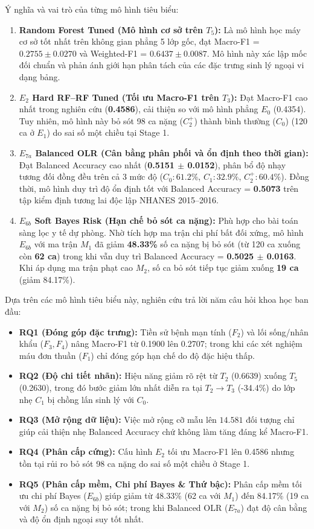 Ý nghĩa và vai trò của từng mô hình tiêu biểu:
\begin{enumerate}
    \item \textbf{Random Forest Tuned (Mô hình cơ sở trên $T_5$):} Là mô hình học máy cơ sở tốt nhất trên không gian phẳng 5 lớp gốc, đạt Macro-F1 = $0.2755 \pm 0.0270$ và Weighted-F1 = $0.6437 \pm 0.0087$. Mô hình này xác lập mốc đối chuẩn và phản ánh giới hạn phân tách của các đặc trưng sinh lý ngoại vi dạng bảng.
    \item \textbf{$E_2$ Hard RF--RF Tuned (Tối ưu Macro-F1 trên $T_3$):} Đạt Macro-F1 cao nhất trong nghiên cứu (\textbf{0.4586}), cải thiện so với mô hình phẳng $E_0$ (0.4354). Tuy nhiên, mô hình này bỏ sót 98 ca nặng ($C_2^+$) thành bình thường ($C_0$) (120 ca ở $E_1$) do sai số một chiều tại Stage 1.
    \item \textbf{$E_{7a}$ Balanced OLR (Cân bằng phân phối và ổn định theo thời gian):} Đạt Balanced Accuracy cao nhất (\textbf{0.5151 $\pm$ 0.0152}), phân bổ độ nhạy tương đối đồng đều trên cả 3 mức độ ($C_0: 61.2\%$, $C_1: 32.9\%$, $C_2^+: 60.4\%$). Đồng thời, mô hình duy trì độ ổn định tốt với Balanced Accuracy = \textbf{0.5073} trên tập kiểm định tương lai độc lập NHANES 2015--2016.
    \item \textbf{$E_{6b}$ Soft Bayes Risk (Hạn chế bỏ sót ca nặng):} Phù hợp cho bài toán sàng lọc y tế dự phòng. Nhờ tích hợp ma trận chi phí bất đối xứng, mô hình $E_{6b}$ với ma trận $M_1$ đã giảm \textbf{48.33\%} số ca nặng bị bỏ sót (từ 120 ca xuống còn \textbf{62 ca}) trong khi vẫn duy trì Balanced Accuracy = \textbf{0.5025 $\pm$ 0.0163}. Khi áp dụng ma trận phạt cao $M_2$, số ca bỏ sót tiếp tục giảm xuống \textbf{19 ca} (giảm 84.17\%).
\end{enumerate}

Dựa trên các mô hình tiêu biểu này, nghiên cứu trả lời năm câu hỏi khoa học ban đầu:
\begin{itemize}
    \item \textbf{RQ1 (Đóng góp đặc trưng):} Tiền sử bệnh mạn tính ($F_2$) và lối sống/nhân khẩu ($F_3, F_4$) nâng Macro-F1 từ 0.1900 lên 0.2707; trong khi các xét nghiệm máu đơn thuần ($F_1$) chỉ đóng góp hạn chế do độ đặc hiệu thấp.
    \item \textbf{RQ2 (Độ chi tiết nhãn):} Hiệu năng giảm rõ rệt từ $T_2$ (0.6639) xuống $T_5$ (0.2630), trong đó bước giảm lớn nhất diễn ra tại $T_2 \to T_3$ (-34.4\%) do lớp nhẹ $C_1$ bị chồng lấn sinh lý với $C_0$.
    \item \textbf{RQ3 (Mở rộng dữ liệu):} Việc mở rộng cỡ mẫu lên $14.581$ đối tượng chỉ giúp cải thiện nhẹ Balanced Accuracy chứ không làm tăng đáng kể Macro-F1.
    \item \textbf{RQ4 (Phân cấp cứng):} Cấu hình $E_2$ tối ưu Macro-F1 lên 0.4586 nhưng tồn tại rủi ro bỏ sót 98 ca nặng do sai số một chiều ở Stage 1.
    \item \textbf{RQ5 (Phân cấp mềm, Chi phí Bayes \& Thứ bậc):} Phân cấp mềm tối ưu chi phí Bayes ($E_{6b}$) giúp giảm từ 48.33\% (62 ca với $M_1$) đến 84.17\% (19 ca với $M_2$) số ca nặng bị bỏ sót; trong khi Balanced OLR ($E_{7a}$) đạt độ cân bằng và độ ổn định ngoại suy tốt nhất.
\end{itemize}

